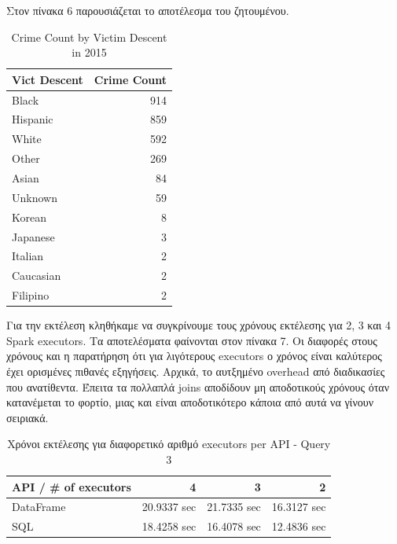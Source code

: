 \documentclass{article}
\begin{document}
Στον πίνακα 6 παρουσιάζεται το αποτέλεσμα του ζητουμένου. 
\begin{table}[h]
\centering
\begin{tabular}{|l|r|}
\hline
\textbf{Vict Descent} & \textbf{Crime Count} \\ \hline
Black                & 914                  \\ \hline
Hispanic             & 859                  \\ \hline
White                & 592                  \\ \hline
Other                & 269                  \\ \hline
Asian                & 84                   \\ \hline
Unknown              & 59                   \\ \hline
Korean               & 8                    \\ \hline
Japanese             & 3                    \\ \hline
Italian              & 2                    \\ \hline
Caucasian            & 2                    \\ \hline
Filipino             & 2                    \\ \hline
\end{tabular}
\caption{Crime Count by Victim Descent in 2015}
\label{table:crime_by_descent}
\end{table}

Για την εκτέλεση κληθήκαμε να συγκρίνουμε τους χρόνους εκτέλεσης για 2, 3 και 4  Spark executors. Τα αποτελέσματα φαίνονται στον πίνακα 7. Οι διαφορές στους χρόνους και η παρατήρηση ότι για λιγότερους  executors  ο χρόνος είναι καλύτερος έχει ορισμένες πιθανές εξηγήσεις. Αρχικά, το αυτξημένο  overhead  από διαδικασίες που ανατίθεντα. Έπειτα τα πολλαπλά  joins  αποδίδουν μη αποδοτικούς χρόνους όταν κατανέμεται το φορτίο, μιας και είναι αποδοτικότερο κάποια από αυτά να γίνουν σειριακά.
\begin{table}[h]
\centering
\begin{tabular}{|l|r|r|r|}
\hline
API / \# of executors & 4             & 3             & 2             \\ \hline
DataFrame            & 20.9337 sec & 21.7335 sec & 16.3127 sec \\ \hline
SQL           & 18.4258 sec & 16.4078 sec & 12.4836 sec \\ \hline
\end{tabular}
\caption{ Χρόνοι εκτέλεσης για διαφορετικό αριθμό executors per API - Query 3}
\label{table:query3_execution_different_executors}
\end{table}
\end{document}
